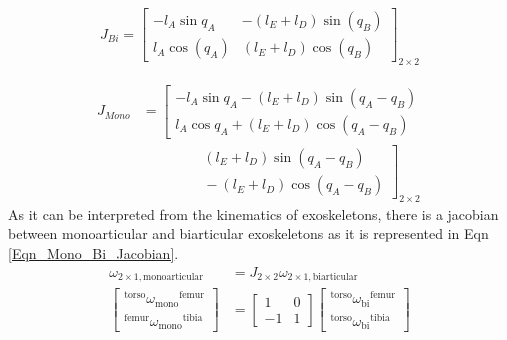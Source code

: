 \documentclass[10pt,letterpaper]{article}
\begin{document}
\begin{gather}\label{Eqn_Bi_Jacobian}
J_{Bi} =
\begin{bmatrix}
-l_{A}\sin{q_{A}}  & -(l_ {E} + l_ {D})\sin (q_ {B})\\
l_ {A}\cos (q_{A}) &  (l_ {E} + l_ {D})\cos (q_ {B})
\end{bmatrix}_{2 \times 2}
\end{gather}

\begin{equation}\label{Eqn_Mono_Jacobian}
\begin{aligned}
J_{Mono}&=
\left[\begin{matrix}
-l_{A}\sin{q_{A}}- (l_ {E} + l_ {D})\sin (q_ {A} - q_ {B})\\
l_{A}\cos{q_{A}} + (l_{E} + l_{D})\cos (q_{A} - q_ {B})
\end{matrix}\right.\\
&\qquad\qquad
\left.\begin{matrix}
{} (l_ {E} + l_ {D})\sin (q_ {A} - q_ {B})\\
{} - (l_ {E} + l_ {D})\cos (q_ {A} - q_ {B})
\end{matrix}\right]_{2\times 2}
\end{aligned}
\end{equation}
As it can be interpreted from the kinematics of exoskeletons, there is a jacobian between monoarticular and biarticular exoskeletons as it is represented in Eqn \eqref{Eqn_Mono_Bi_Jacobian}.
\begin{equation}\label{Eqn_Mono_Bi_Jacobian}
\begin{aligned}
\omega_{2\times 1, \mathrm{monoarticular}} &= J_{2\times 2}\omega_{2\times 1, \mathrm{biarticular}}\\
\left\lbrack \begin{array}{c}
{}^{\mathrm{torso}} {\omega_{\mathrm{mono}} }^{\mathrm{femur}} \\
{}^{\mathrm{femur}} {\omega_{\mathrm{mono}} }^{\mathrm{tibia}} 
\end{array}\right\rbrack &=\left\lbrack \begin{array}{cc}
1 & 0\\
-1 & 1
\end{array}\right\rbrack \left\lbrack \begin{array}{c}
{}^{\mathrm{torso}} {\omega_{\mathrm{bi}} }^{\mathrm{femur}} \\
{}^{\mathrm{torso}} {\omega_{\mathrm{bi}} }^{\mathrm{tibia}} 
\end{array}\right\rbrack
\end{aligned}
\end{equation}
\end{document}
